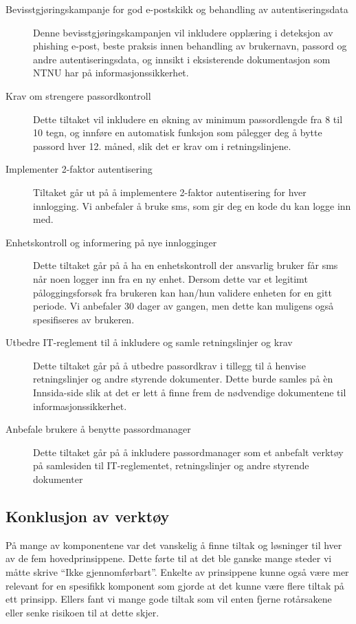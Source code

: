 \begin{description}
    \item[Bevisstgjøringskampanje for god e-postskikk og behandling av autentiseringsdata] Denne bevisstgjøringskampanjen vil inkludere opplæring i deteksjon av phishing e-post, beste praksis innen behandling av brukernavn, passord og andre autentiseringsdata, og innsikt i eksisterende dokumentasjon som NTNU har på informasjonssikkerhet. 
    \item[Krav om strengere passordkontroll] Dette tiltaket vil inkludere en økning av minimum passordlengde fra 8 til 10 tegn, og innføre en automatisk funksjon som pålegger deg å bytte passord hver 12. måned, slik det er krav om i retningslinjene. 
    \item[Implementer 2-faktor autentisering] Tiltaket går ut på å implementere 2-faktor autentisering for hver innlogging. Vi anbefaler å bruke sms, som gir deg en kode du kan logge inn med. 
    \item[Enhetskontroll og informering på nye innlogginger] Dette tiltaket går på å ha en enhetskontroll der ansvarlig bruker får sms når noen logger inn fra en ny enhet. Dersom dette var et legitimt påloggingsforsøk fra brukeren kan han/hun validere enheten for en gitt periode. Vi anbefaler 30 dager av gangen, men dette kan muligens også spesifiseres av brukeren. 
    \item[Utbedre IT-reglement til å inkludere og samle retningslinjer og krav] Dette tiltaket går på å utbedre passordkrav i tillegg til å henvise retningslinjer og andre styrende dokumenter. Dette burde samles på èn Innsida-side slik at det er lett å finne frem de nødvendige dokumentene til informasjonssikkerhet. 
    \item[Anbefale brukere å benytte passordmanager] Dette tiltaket går på å inkludere passordmanager som et anbefalt verktøy på samlesiden til IT-reglementet, retningslinjer og andre styrende dokumenter
\end{description}

\subsection{Konklusjon av verktøy}
På mange av komponentene var det vanskelig å finne tiltak og løsninger til hver av de fem hovedprinsippene. Dette førte til at det ble ganske mange steder vi måtte skrive ``Ikke gjennomførbart''. Enkelte av prinsippene kunne også være mer relevant for en spesifikk komponent som gjorde at det kunne være flere tiltak på ett prinsipp. Ellers fant vi mange gode tiltak som vil enten fjerne rotårsakene eller senke risikoen til at dette skjer. 